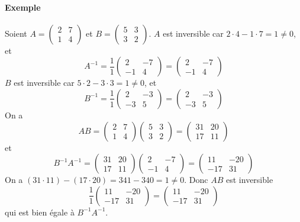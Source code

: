 \paragraph{Exemple} Soient $A = \begin{pmatrix} 2 & 7 \\ 1 & 4 \end{pmatrix}$ et $B = \begin{pmatrix} 5 & 3 \\ 3 & 2 \end{pmatrix}$.
$A$ est inversible car $2 \cdot 4 - 1 \cdot 7 = 1 \neq 0$, et
$$A^{-1} = \frac{1}{1} \begin{pmatrix} 2 & -7 \\ -1 & 4 \end{pmatrix} = \begin{pmatrix} 2 & -7 \\ -1 & 4 \end{pmatrix}$$
$B$ est inversible car $5 \cdot 2 - 3 \cdot 3 = 1 \neq 0$, et 
$$B^{-1} = \frac{1}{1} \begin{pmatrix} 2 & -3 \\ -3 & 5 \end{pmatrix} = \begin{pmatrix} 2 & -3\\ -3 & 5 \end{pmatrix}$$
On a 
$$A B = \begin{pmatrix} 2 & 7 \\ 1 & 4 \end{pmatrix} 
  \begin{pmatrix}5&3\\3&2\end{pmatrix}
  = \begin{pmatrix} 31 & 20 \\ 17 & 11 \end{pmatrix}$$
et
$$B^{-1} A^{-1} = \begin{pmatrix} 31 & 20 \\ 17 & 11 \end{pmatrix} 
  \begin{pmatrix} 2 & -7 \\ -1 & 4 \end{pmatrix} 
  = \begin{pmatrix} 11 & -20 \\ -17 & 31 \end{pmatrix}$$
On a $(31 \cdot 11) - (17 \cdot 20) = 341 - 340 = 1 \neq 0$. Donc $A B$ est inversible 
$$\frac{1}{1} \begin{pmatrix} 11 & -20 \\ -17 & 31 \end{pmatrix} 
  = \begin{pmatrix} 11 & -20 \\ -17 & 31 \end{pmatrix}$$
qui est bien égale à $B^{-1} A^{-1}$.

